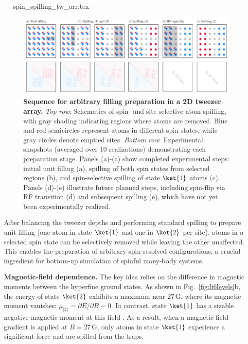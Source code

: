 --- spin_spilling_tw_arr.tex ---

\begin{figure}
    \centering
    \includegraphics{fig-ai/preparation-array-ai.pdf}
    \caption{
    \textbf{Sequence for arbitrary filling preparation in a 2D tweezer array.}
    \textit{Top row}: Schematics of spin- and site-selective atom spilling, with gray shading indicating regions where atoms are removed. Blue and red semicircles represent atoms in different spin states, while gray circles denote emptied sites.
    \textit{Bottom row}: Experimental snapshots (averaged over 10 realizations) demonstrating each preparation stage. Panels (a)-(c) show completed experimental steps: initial unit filling (a), spilling of both spin states from selected regions (b), and spin-selective spilling of state $\ket{1}$ atoms (c). Panels (d)-(e) illustrate future planned steps, including spin-flip via RF transition (d) and subsequent spilling (e), which have not yet been experimentally realized.
    }
    \label{fig:preparation-array}
\end{figure}




After balancing the tweezer depths and performing standard spilling to prepare unit filling (one atom in state $\ket{1}$ and one in $\ket{2}$ per site), atoms in a selected spin state can be selectively removed while leaving the other unaffected. This enables the preparation of arbitrary spin-resolved configurations, a crucial ingredient for bottom-up simulation of spinful many-body systems.

\textbf{Magnetic-field dependence.}
The key idea relies on the difference in magnetic moments between the hyperfine ground states. As shown in Fig.~\ref{fig:li6levels}b, the energy of state $\ket{2}$ exhibits a maximum near $27\,\mathrm{G}$, where its magnetic moment vanishes: $\mu_{|2\rangle} = \partial E / \partial B = 0$. In contrast, state $\ket{1}$ has a sizable negative magnetic moment at this field . As a result, when a magnetic field gradient is applied at $B = 27\,\mathrm{G}$, only atoms in state $\ket{1}$ experience a significant force and are spilled from the traps.

